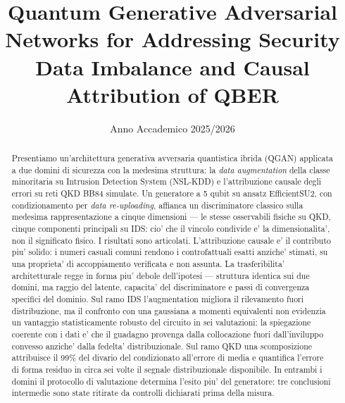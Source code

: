 \documentclass[10pt,conference,a4paper,twocolumn]{IEEEtran}
\begin{document}
\title{Quantum Generative Adversarial Networks for Addressing Security Data Imbalance and Causal Attribution of QBER}

\author{
    \and
    \and
}
\date{Anno Accademico 2025/2026}


\maketitle

\begin{abstract}
    Presentiamo un'architettura generativa avversaria quantistica ibrida (QGAN) applicata a due domini di sicurezza con la medesima struttura: la \textit{data augmentation} della classe minoritaria su Intrusion Detection System (NSL-KDD) e l'attribuzione causale degli errori su reti QKD BB84 simulate. Un generatore a 5 qubit su ansatz EfficientSU2, con condizionamento per \textit{data re-uploading}, affianca un discriminatore classico sulla medesima rappresentazione a cinque dimensioni — le stesse osservabili fisiche su QKD, cinque componenti principali su IDS: cio' che il vincolo condivide e' la dimensionalita', non il significato fisico. I risultati sono articolati. L'attribuzione causale e' il contributo piu' solido: i numeri casuali comuni rendono i controfattuali esatti anziche' stimati, su una proprieta' di accoppiamento verificata e non assunta. La trasferibilita' architetturale regge in forma piu' debole dell'ipotesi — struttura identica sui due domini, ma raggio del latente, capacita' del discriminatore e passi di convergenza specifici del dominio. Sul ramo IDS l'augmentation migliora il rilevamento fuori distribuzione, ma il confronto con una gaussiana a momenti equivalenti non evidenzia un vantaggio statisticamente robusto del circuito in sei valutazioni: la spiegazione coerente con i dati e' che il guadagno provenga dalla collocazione fuori dall'inviluppo convesso anziche' dalla fedelta' distribuzionale. Sul ramo QKD una scomposizione attribuisce il 99\% del divario del condizionato all'errore di media e quantifica l'errore di forma residuo in circa sei volte il segnale distribuzionale disponibile. In entrambi i domini il protocollo di valutazione determina l'esito piu' del generatore: tre conclusioni intermedie sono state ritirate da controlli dichiarati prima della misura.
\end{abstract}
\end{document}
